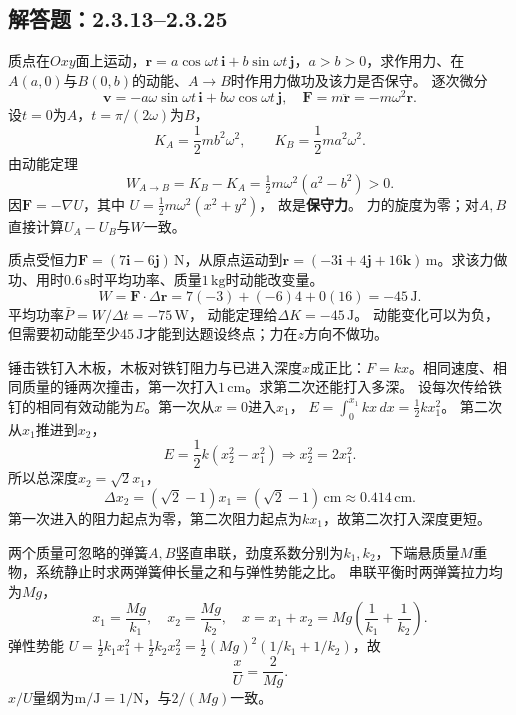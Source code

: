 
\subsection{解答题：2.3.13--2.3.25}

\problemtext 质点在$Oxy$面上运动，$\bm r=a\cos\omega t\,\bm i+b\sin\omega t\,\bm j$，$a>b>0$，求作用力、在$A(a,0)$与$B(0,b)$的动能、$A\to B$时作用力做功及该力是否保守。
\workings
逐次微分
\[
\bm v=-a\omega\sin\omega t\,\bm i+b\omega\cos\omega t\,\bm j,
\quad
\bm F=m\ddot{\bm r}=-m\omega^2\bm r.
\]
设$t=0$为$A$，$t=\pi/(2\omega)$为$B$，
\[
\boxed{K_A=\frac12m b^2\omega^2},\qquad
\boxed{K_B=\frac12m a^2\omega^2}.
\]
由动能定理
\[
\boxed{W_{A\to B}=K_B-K_A
=\tfrac12m\omega^2(a^2-b^2)>0}.
\]
因$\bm F=-\nabla U$，其中
$U=\frac12m\omega^2(x^2+y^2)$，
故是\textbf{保守力}。
\crosscheck 力的旋度为零；对$A,B$直接计算$U_A-U_B$与$W$一致。

\problemtext 质点受恒力$\bm F=(7\bm i-6\bm j)\,\mathrm N$，从原点运动到$\bm r=(-3\bm i+4\bm j+16\bm k)\,\mathrm m$。求该力做功、用时$0.6\,\mathrm s$时平均功率、质量$1\,\mathrm{kg}$时动能改变量。
\workings
\[
W=\bm F\cdot\Delta\bm r=7(-3)+(-6)4+0(16)
=\boxed{-45\,\mathrm J}.
\]
平均功率$\boxed{\bar P=W/\Delta t=-75\,\mathrm W}$，
动能定理给$\boxed{\Delta K=-45\,\mathrm J}$。
\crosscheck 动能变化可以为负，但需要初动能至少$45\,\mathrm J$才能到达题设终点；力在$z$方向不做功。

\problemtext 锤击铁钉入木板，木板对铁钉阻力与已进入深度$x$成正比：$F=kx$。相同速度、相同质量的锤两次撞击，第一次打入$1\,\mathrm{cm}$。求第二次还能打入多深。
\workings
设每次传给铁钉的相同有效动能为$E$。第一次从$x=0$进入$x_1$，
$E=\int_0^{x_1}kx\,dx=\frac12kx_1^2$。
第二次从$x_1$推进到$x_2$，
\[
E=\frac12k(x_2^2-x_1^2)
\Longrightarrow x_2^2=2x_1^2.
\]
所以总深度$x_2=\sqrt2 x_1$，
\[
\boxed{\Delta x_2=(\sqrt2-1)x_1
=(\sqrt2-1)\,\mathrm{cm}\approx0.414\,\mathrm{cm}}.
\]
\crosscheck 第一次进入的阻力起点为零，第二次阻力起点为$kx_1$，故第二次打入深度更短。

\problemtext 两个质量可忽略的弹簧$A,B$竖直串联，劲度系数分别为$k_1,k_2$，下端悬质量$M$重物，系统静止时求两弹簧伸长量之和与弹性势能之比。
\workings
串联平衡时两弹簧拉力均为$Mg$，
\[
x_1=\frac{Mg}{k_1},\quad x_2=\frac{Mg}{k_2},\quad
x=x_1+x_2=Mg\left(\frac1{k_1}+\frac1{k_2}\right).
\]
弹性势能
$U=\frac12 k_1x_1^2+\frac12k_2x_2^2
=\frac12(Mg)^2(1/k_1+1/k_2)$，故
\[
\boxed{\frac{x}{U}=\frac{2}{Mg}}.
\]
\crosscheck $x/U$量纲为$\mathrm{m/J=1/N}$，与$2/(Mg)$一致。

